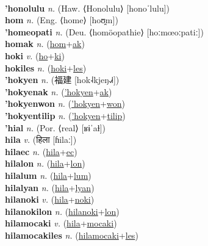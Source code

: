  \label{holyan} \\
\textbf{'honolulu} \textit{n.} (Haw. ⟨Honolulu⟩ [honoˈlulu])
 \label{'honolulu} \\
\textbf{hom} \textit{n.} (Eng. ⟨home⟩ [hoʊ̯m])
 \label{hom} \\
\textbf{'homeopati} \textit{n.} (Deu. ⟨homöopathie⟩ [hoːmœoːpatiː])
 \label{'homeopati} \\
\textbf{homak} \textit{n.} (\hyperref[hom]{hom}+\hyperref[ak]{ak})
 \label{homak} \\
\textbf{hoki} \textit{v.} (\hyperref[ho]{ho}+\hyperref[ki]{ki})
 \label{hoki} \\
\textbf{hokiles} \textit{n.} (\hyperref[hoki]{hoki}+\hyperref[les]{les})
 \label{hokiles} \\
\textbf{'hokyen} \textit{n.} ({\chinese{}福建} [hok˨kjeŋ˨˩˧])
 \label{'hokyen} \\
\textbf{'hokyenak} \textit{n.} (\hyperref['hokyen]{'hokyen}+\hyperref[ak]{ak})
 \label{'hokyenak} \\
\textbf{'hokyenwon} \textit{n.} (\hyperref['hokyen]{'hokyen}+\hyperref[won]{won})
 \label{'hokyenwon} \\
\textbf{'hokyentilip} \textit{n.} (\hyperref['hokyen]{'hokyen}+\hyperref[tilip]{tilip})
 \label{'hokyentilip} \\
\textbf{'hial} \textit{n.} (Por. ⟨real⟩ [ʁɨˈaɫ])
 \label{'hial} \\
\textbf{hila} \textit{v.} ({\devanagari{}हिला} [ɦilaː])
 \label{hila} \\
\textbf{hilaec} \textit{n.} (\hyperref[hila]{hila}+\hyperref[ec]{ec})
 \label{hilaec} \\
\textbf{hilalon} \textit{n.} (\hyperref[hila]{hila}+\hyperref[lon]{lon})
 \label{hilalon} \\
\textbf{hilalum} \textit{n.} (\hyperref[hila]{hila}+\hyperref[lum]{lum})
 \label{hilalum} \\
\textbf{hilalyan} \textit{n.} (\hyperref[hila]{hila}+\hyperref[lyan]{lyan})
 \label{hilalyan} \\
\textbf{hilanoki} \textit{v.} (\hyperref[hila]{hila}+\hyperref[noki]{noki})
 \label{hilanoki} \\
\textbf{hilanokilon} \textit{n.} (\hyperref[hilanoki]{hilanoki}+\hyperref[lon]{lon})
 \label{hilanokilon} \\
\textbf{hilamocaki} \textit{v.} (\hyperref[hila]{hila}+\hyperref[mocaki]{mocaki})
 \label{hilamocaki} \\
\textbf{hilamocakiles} \textit{n.} (\hyperref[hilamocaki]{hilamocaki}+\hyperref[les]{les})
